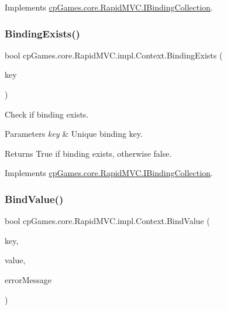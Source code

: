 Implements \mbox{\hyperlink{interfacecp_games_1_1core_1_1_rapid_m_v_c_1_1_i_binding_collection_afff4c2ad2ff9fb25c906864bc28f036f}{cp\+Games.\+core.\+Rapid\+M\+V\+C.\+I\+Binding\+Collection}}.

\mbox{\label{classcp_games_1_1core_1_1_rapid_m_v_c_1_1impl_1_1_context_a57ed228fbab80263bf2197dd27eadbbd}} 
\subsubsection{\texorpdfstring{BindingExists()}{BindingExists()}}
{\footnotesize\ttfamily bool cp\+Games.\+core.\+Rapid\+M\+V\+C.\+impl.\+Context.\+Binding\+Exists (\begin{DoxyParamCaption}\item[{\mbox{\hyperlink{interfacecp_games_1_1core_1_1_rapid_m_v_c_1_1_i_binding_key}{I\+Binding\+Key}}}]{key }\end{DoxyParamCaption})}



Check if binding exists. 


\begin{DoxyParams}{Parameters}
{\em key} & Unique binding key.\\
\hline
\end{DoxyParams}
\begin{DoxyReturn}{Returns}
True if binding exists, otherwise false.
\end{DoxyReturn}


Implements \mbox{\hyperlink{interfacecp_games_1_1core_1_1_rapid_m_v_c_1_1_i_binding_collection_a39534c8594adf07fb09af75f6d0a0de8}{cp\+Games.\+core.\+Rapid\+M\+V\+C.\+I\+Binding\+Collection}}.

\mbox{\label{classcp_games_1_1core_1_1_rapid_m_v_c_1_1impl_1_1_context_a7b95216e2e1d82d2623c0d8754883328}} 
\subsubsection{\texorpdfstring{BindValue()}{BindValue()}}
{\footnotesize\ttfamily bool cp\+Games.\+core.\+Rapid\+M\+V\+C.\+impl.\+Context.\+Bind\+Value (\begin{DoxyParamCaption}\item[{\mbox{\hyperlink{interfacecp_games_1_1core_1_1_rapid_m_v_c_1_1_i_binding_key}{I\+Binding\+Key}}}]{key,  }\item[{object}]{value,  }\item[{out string}]{error\+Message }\end{DoxyParamCaption})}



